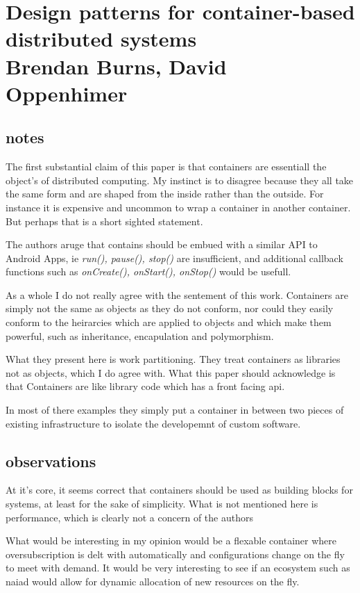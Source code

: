 \section{Design patterns for container-based distributed systems \\ \small{Brendan Burns, David Oppenhimer}}

\subsection{notes}

The first substantial claim of this paper is that containers are essentiall the
object's of distributed computing. My instinct is to disagree because they all
take the same form and are shaped from the inside rather than the outside. For
instance it is expensive and uncommon to wrap a container in another container.
But perhaps that is a short sighted statement.

The authors aruge that contains should be embued with a similar API to Android
Apps, ie \textit{run(), pause(), stop()} are insufficient, and additional
callback functions such as \textit{onCreate(), onStart(), onStop()} would be
usefull.

As a whole I do not really agree with the sentement of this work. Containers
are simply not the same as objects as they do not conform, nor could they
easily conform to the heirarcies which are applied to objects and which make
them powerful, such as inheritance, encapulation and polymorphism. 

What they present here is work partitioning. They treat containers as libraries
not as objects, which I do agree with. What this paper should acknowledge is
that Containers are like library code which has a front facing api.

In most of there examples they simply put a container in between two pieces of
existing infrastructure to isolate the developemnt of custom software.

\subsection{observations}

At it's core, it seems correct that containers should be used as building
blocks for systems, at least for the sake of simplicity. What is not mentioned
here is performance, which is clearly not a concern of the authors

What would be interesting in my opinion would be a flexable container where
oversubscription is delt with automatically and configurations change on the
fly to meet with demand. It would be very interesting to see if an ecosystem
such as naiad would allow for dynamic allocation of new resources on the fly.

